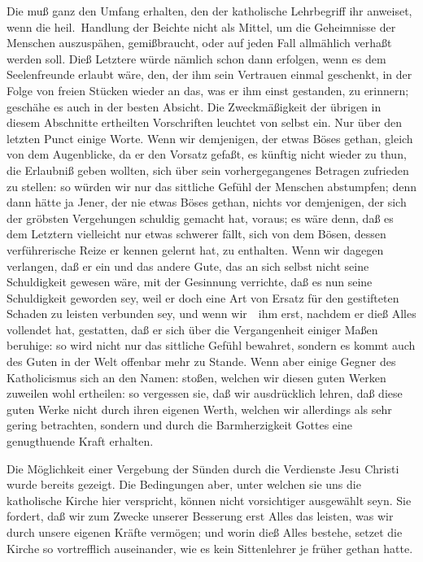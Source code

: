 \begin{aufza}
\item Die  muß ganz den Umfang erhalten, den der katholische Lehrbegriff ihr anweiset, wenn die heil.\ Handlung der Beichte nicht als Mittel, um die Geheimnisse der Menschen auszuspähen, gemißbraucht, oder auf jeden Fall allmählich verhaßt werden soll. Dieß Letztere würde nämlich schon dann erfolgen, wenn es dem Seelenfreunde erlaubt wäre, den, der ihm sein Vertrauen einmal geschenkt, in der Folge von freien Stücken wieder an das, was er ihm einst gestanden, zu erinnern; geschähe es auch in der besten Absicht. Die Zweckmäßigkeit der übrigen in diesem Abschnitte ertheilten Vorschriften leuchtet von selbst ein. Nur über den letzten Punct einige Worte. Wenn wir demjenigen, der etwas Böses gethan, gleich von dem Augenblicke, da er den Vorsatz gefaßt, es künftig nicht wieder zu thun, die Erlaubniß geben wollten, sich über sein vorhergegangenes Betragen zufrieden zu stellen: so würden wir nur das sittliche Gefühl der Menschen abstumpfen; denn dann hätte ja Jener, der nie etwas Böses gethan, nichts vor demjenigen, der sich der gröbsten Vergehungen schuldig gemacht hat, voraus; es wäre denn, daß es dem Letztern vielleicht nur etwas schwerer fällt, sich von dem Bösen, dessen verführerische Reize er kennen gelernt hat, zu enthalten. Wenn wir dagegen verlangen, daß er ein und das andere Gute, das an sich selbst nicht seine Schuldigkeit gewesen wäre, mit der Gesinnung verrichte, daß es nun seine Schuldigkeit geworden sey, weil er doch eine Art von Ersatz für den gestifteten Schaden zu leisten verbunden sey, und wenn wir~\ ihm erst, nachdem er dieß Alles vollendet hat, gestatten, daß er sich über die Vergangenheit einiger Maßen beruhige: so wird nicht nur das sittliche Gefühl bewahret, sondern es kommt auch des Guten in der Welt offenbar mehr zu Stande. Wenn aber einige Gegner des Katholicismus sich an den Namen:  stoßen, welchen wir diesen guten Werken zuweilen wohl ertheilen: so vergessen sie, daß wir ausdrücklich lehren, daß diese guten Werke nicht durch ihren eigenen Werth, welchen wir allerdings als sehr gering betrachten, sondern  und durch die Barmherzigkeit Gottes eine genugthuende Kraft erhalten.
\item Die Möglichkeit einer Vergebung der Sünden durch die Verdienste Jesu Christi wurde bereits gezeigt. Die Bedingungen aber, unter welchen sie uns die katholische Kirche hier verspricht, können nicht vorsichtiger ausgewählt seyn. Sie fordert, daß wir zum Zwecke unserer Besserung erst Alles das leisten, was wir durch unsere eigenen Kräfte vermögen; und worin dieß Alles bestehe, setzet die Kirche so vortrefflich auseinander, wie es kein Sittenlehrer je früher gethan hatte.

\end{aufza}
